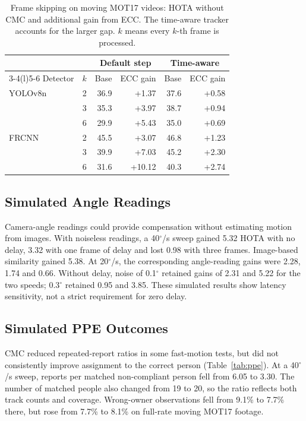 \documentclass[conference]{IEEEtran}
\begin{document}
\begin{table}[t]
\caption{Frame skipping on moving MOT17 videos: HOTA without CMC and additional gain from ECC. The time-aware tracker accounts for the larger gap. $k$ means every $k$-th frame is processed.}
\label{tab:stride}
\centering\footnotesize
\setlength{\tabcolsep}{4pt}
\begin{tabular}{@{}lrrrrr@{}}
\toprule
 & & \multicolumn{2}{c}{Default step} & \multicolumn{2}{c}{Time-aware}\\
\cmidrule(lr){3-4}\cmidrule(l){5-6}
Detector & $k$ & Base & ECC gain & Base & ECC gain\\
\midrule
YOLOv8n & 2 & 36.9 & +1.37 & 37.6 & +0.58\\
 & 3 & 35.3 & +3.97 & 38.7 & +0.94\\
 & 6 & 29.9 & +5.43 & 35.0 & +0.69\\
FRCNN & 2 & 45.5 & +3.07 & 46.8 & +1.23\\
 & 3 & 39.9 & +7.03 & 45.2 & +2.30\\
 & 6 & 31.6 & +10.12 & 40.3 & +2.74\\
\bottomrule
\end{tabular}
\end{table}

\subsection{Simulated Angle Readings}
Camera-angle readings could provide compensation without estimating motion from images. With noiseless readings, a 40$^\circ$/s sweep gained 5.32 HOTA with no delay, 3.32 with one frame of delay and lost 0.98 with three frames. Image-based similarity gained 5.38. At 20$^\circ$/s, the corresponding angle-reading gains were 2.28, 1.74 and 0.66. Without delay, noise of 0.1$^\circ$ retained gains of 2.31 and 5.22 for the two speeds; 0.3$^\circ$ retained 0.95 and 3.85. These simulated results show latency sensitivity, not a strict requirement for zero delay.

\subsection{Simulated PPE Outcomes}
CMC reduced repeated-report ratios in some fast-motion tests, but did not consistently improve assignment to the correct person (Table~\ref{tab:ppe}). At a 40$^\circ$/s sweep, reports per matched non-compliant person fell from 6.05 to 3.30. The number of matched people also changed from 19 to 20, so the ratio reflects both track counts and coverage. Wrong-owner observations fell from 9.1\% to 7.7\% there, but rose from 7.7\% to 8.1\% on full-rate moving MOT17 footage.
\end{document}
